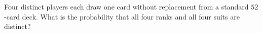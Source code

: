 Four distinct players each draw one card without replacement from a standard $52$-card deck. What is the probability that all four ranks and all four suits are distinct?
